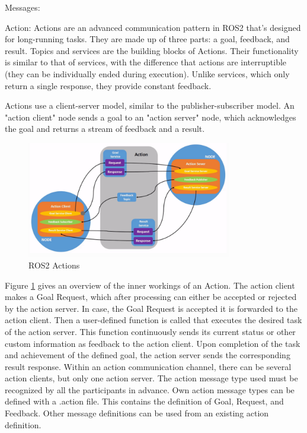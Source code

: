 \begin{labeling}{Messages:}
		\item [Action:]
		Actions are an advanced communication pattern in ROS2 that's designed for long-running tasks. They are made up of three parts: a goal, feedback, and result.
		Topics and services are the building blocks of Actions. Their functionality is similar to that of services, with the difference that actions are interruptible (they can be individually ended during execution). Unlike services, which only return a single response, they provide constant feedback.
		
		Actions use a client-server model, similar to the publisher-subscriber model. An "action client" node sends a goal to an "action server" node, which acknowledges the goal and returns a stream of feedback and a result. 

		\begin{figure}[H]
			\centering
			\includegraphics[width=0.8\textwidth]{"Bilder/ros-actions.png"}
			\caption{ROS2 Actions \cite{ros2Tutorials}}
			\label{fig:Background:Ros2Actions}					
		\end{figure}

		Figure \ref{fig:Background:Ros2Actions} gives an overview of the inner workings of an Action. The action client makes a Goal Request, which after processing can either be accepted or rejected by the action server. In case, the Goal Request is accepted it is forwarded to the action client. Then a user-defined function is called that executes the desired task of the action server. This function continuously sends its current status or other custom information as feedback to the action client. Upon completion of the task and achievement of the defined goal, the action server sends the corresponding result response. Within an action communication channel, there can be several action clients, but only one action server. The action message type used must be recognized by all the participants in advance. Own action message types can be defined with a .action file. This contains the definition of Goal, Request, and Feedback. Other message definitions can be used from an existing action definition.		
		
	\end{labeling}

